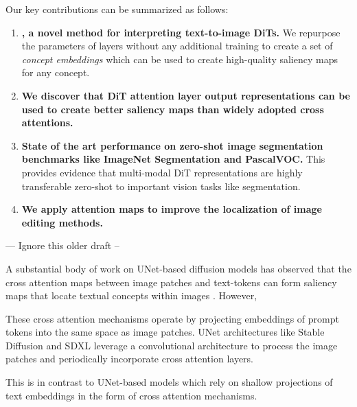Our key contributions can be summarized as follows:
\begin{enumerate}
    \item \textbf{\tool{}, a novel method for interpreting text-to-image DiTs.} We repurpose the parameters of \layername{} layers without any additional training to create a set of \textit{concept embeddings} which can be used to create high-quality saliency maps for any concept. 
    \item \textbf{We discover that DiT attention layer output representations can be used to create better saliency maps than widely adopted cross attentions. }
    \item \textbf{State of the art performance on zero-shot image segmentation benchmarks like ImageNet Segmentation and PascalVOC. }
    This provides evidence that multi-modal DiT representations are highly transferable zero-shot to important vision tasks like segmentation.
    \item \textbf{We apply \tool{} attention maps to improve the localization of image editing methods. }
\end{enumerate}

--- Ignore this older draft --


A substantial body of work on UNet-based diffusion models has observed that the cross attention maps between image patches and text-tokens can form saliency maps that locate textual concepts within images \cite{hertz_prompt--prompt_2022, tang_what_2022}. However, 



These cross attention mechanisms operate by projecting embeddings of prompt tokens into the same space as image patches. UNet architectures like Stable Diffusion \cite{} and SDXL \cite{} leverage a convolutional architecture to process the image patches and periodically incorporate cross attention layers.  



This is in contrast to UNet-based models which rely on shallow projections of text embeddings in the form of cross attention mechanisms.

